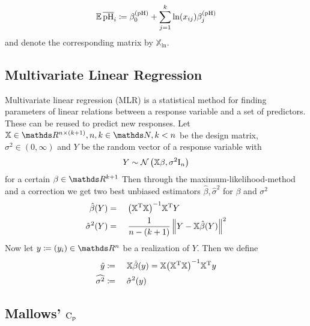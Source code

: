 		\[
			\operatorname{\mathbb{E}} \mathrm{\overline{pH}}_i \coloneqq \beta^{\mathrm{\mathrm{(pH)}}}_0 + \sum_{j = 1}^k{\ln (x_{ij}) \beta^{\mathrm{(pH)}}_j} 
		\]
		and denote the corresponding matrix by $\mathbb{X}_{\ln}$.

	

	\subsection{Multivariate Linear Regression}
	\label{ssec:mlr}
	
		Multivariate linear regression (MLR) is a statistical method for finding parameters of linear relations between a response variable and a set of predictors.
		These can be reused to predict new responses.
		Let $\mathbb{X}\in\SR^{n\times(k+1)}, n,k\in\SN,k<n$ be the design matrix, $\sigma^2\in(0,\infty)$ and $Y$ be the random vector of a response variable with
		\[
			Y \sim \mathcal{N}\left( \mathbb{X}\beta,\sigma^2\mathrm{I}_n \right)
		\]
		for a certain $\beta\in\SR^{k+1}$
		Then through the maximum-likelihood-method and a correction we get two best unbiased estimators $\hat{\beta},\hat{\sigma}^2$ for $\beta$ and $\sigma^2$
		\begin{alignat*}{3}
			\hat{\beta}(Y) &=&&\ \inv{\curvb{\transp{\mathbb{X}}\mathbb{X}}}\transp{\mathbb{X}}Y \\
			\hat{\sigma}^2(Y) &=&&\ \frac{1}{n-(k+1)}\norm{Y - \mathbb{X}\hat{\beta}(Y)}^2
		\end{alignat*}
		Now let $y \define (y_i)\in\SR^n$ be a realization of $Y$.
		Then we define
		\begin{alignat*}{3}
			\hat{y} &\define&&\ \mathbb{X}\hat{\beta}(y) = \mathbb{X}\inv{\curvb{\transp{\mathbb{X}}\mathbb{X}}}\transp{\mathbb{X}}y \\
			\widehat{{\sigma}^2} &\define&&\ \hat{\sigma}^2(y)
		\end{alignat*}


	\subsection{Mallows' $\mathrm{C_p}$}
	\label{ssec:mallows-C_p}
	
